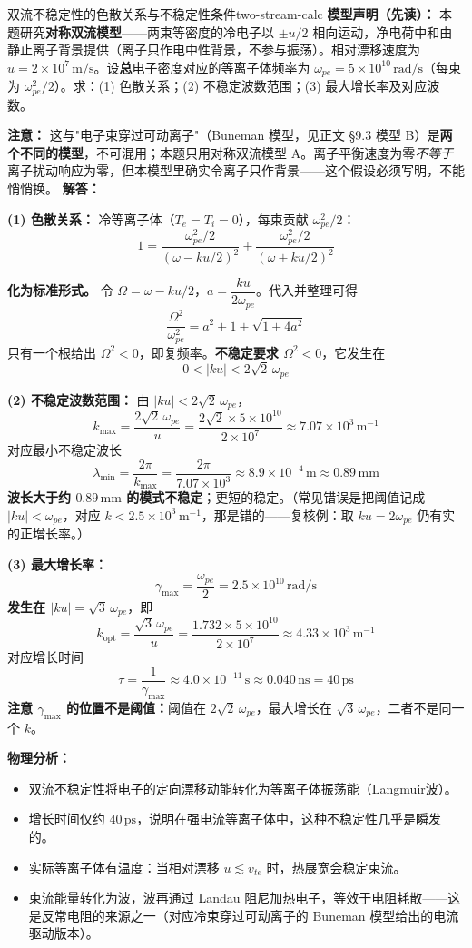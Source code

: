 \begin{example}{双流不稳定性的色散关系与不稳定性条件}{two-stream-calc}
\textbf{模型声明（先读）：} 本题研究\textbf{对称双流模型}——两束等密度的冷电子以 $\pm u/2$ 相向运动，净电荷中和由静止离子背景提供（离子只作电中性背景，不参与振荡）。相对漂移速度为 $u = 2\times 10^{7}\,\mathrm{m/s}$。设\textbf{总}电子密度对应的等离子体频率为 $\omega_{pe} = 5\times 10^{10}\,\mathrm{rad/s}$（每束为 $\omega_{pe}^2/2$）。求：(1) 色散关系；(2) 不稳定波数范围；(3) 最大增长率及对应波数。

\textbf{注意：} 这与"电子束穿过可动离子"（Buneman 模型，见正文 \S9.3 模型 B）是\textbf{两个不同的模型}，不可混用；本题只用对称双流模型 A。离子平衡速度为零\emph{不等于}离子扰动响应为零，但本模型里确实令离子只作背景——这个假设必须写明，不能悄悄换。
\tcblower
\textbf{解答：}

\textbf{(1) 色散关系：} 冷等离子体（$T_e=T_i=0$），每束贡献 $\omega_{pe}^2/2$：
\[
1=\frac{\omega_{pe}^2/2}{(\omega-ku/2)^2}+\frac{\omega_{pe}^2/2}{(\omega+ku/2)^2}
\]

\textbf{化为标准形式。} 令 $\Omega=\omega-ku/2$，$a=\dfrac{ku}{2\omega_{pe}}$。代入并整理可得
\[
\frac{\Omega^2}{\omega_{pe}^2}=a^2+1\pm\sqrt{1+4a^2}
\]
只有一个根给出 $\Omega^2<0$，即复频率。\textbf{不稳定要求 $\Omega^2<0$}，它发生在
\[
0<|ku|<2\sqrt2\,\omega_{pe}
\]

\textbf{(2) 不稳定波数范围：} 由 $|ku|<2\sqrt2\,\omega_{pe}$，
\[
k_{\max}=\frac{2\sqrt2\,\omega_{pe}}{u}=\frac{2\sqrt2\times 5\times10^{10}}{2\times10^{7}}
\approx 7.07\times 10^{3}\,\mathrm{m}^{-1}
\]
对应最小不稳定波长
\[
\lambda_{\min}=\frac{2\pi}{k_{\max}}=\frac{2\pi}{7.07\times10^{3}}\approx 8.9\times 10^{-4}\,\mathrm{m}\approx 0.89\,\mathrm{mm}
\]
\textbf{波长大于约 $0.89\,\mathrm{mm}$ 的模式不稳定}；更短的稳定。（常见错误是把阈值记成 $|ku|<\omega_{pe}$，对应 $k<2.5\times10^3\,\mathrm{m^{-1}}$，那是错的——复核例：取 $ku=2\omega_{pe}$ 仍有实的正增长率。）

\textbf{(3) 最大增长率：}
\[
\gamma_{\max}=\frac{\omega_{pe}}{2}=2.5\times 10^{10}\,\mathrm{rad/s}
\]
\textbf{发生在 $|ku|=\sqrt3\,\omega_{pe}$}，即
\[
k_{\text{opt}}=\frac{\sqrt3\,\omega_{pe}}{u}=\frac{1.732\times5\times10^{10}}{2\times10^{7}}\approx 4.33\times10^{3}\,\mathrm{m}^{-1}
\]
对应增长时间
\[
\tau=\frac{1}{\gamma_{\max}}\approx 4.0\times 10^{-11}\,\mathrm{s}\approx 0.040\,\mathrm{ns}=40\,\mathrm{ps}
\]
\textbf{注意 $\gamma_{\max}$ 的位置不是阈值：}阈值在 $2\sqrt2\,\omega_{pe}$，最大增长在 $\sqrt3\,\omega_{pe}$，二者不是同一个 $k$。

\textbf{物理分析：}
\begin{itemize}[leftmargin=*,itemsep=0pt]
\item 双流不稳定性将电子的定向漂移动能转化为等离子体振荡能（Langmuir波）。
\item 增长时间仅约 $40\,\mathrm{ps}$，说明在强电流等离子体中，这种不稳定性几乎是瞬发的。
\item 实际等离子体有温度：当相对漂移 $u\lesssim v_{te}$ 时，热展宽会稳定束流。
\item 束流能量转化为波，波再通过 Landau 阻尼加热电子，等效于电阻耗散——这是反常电阻的来源之一（对应冷束穿过可动离子的 Buneman 模型给出的电流驱动版本）。
\end{itemize}
\end{example}

